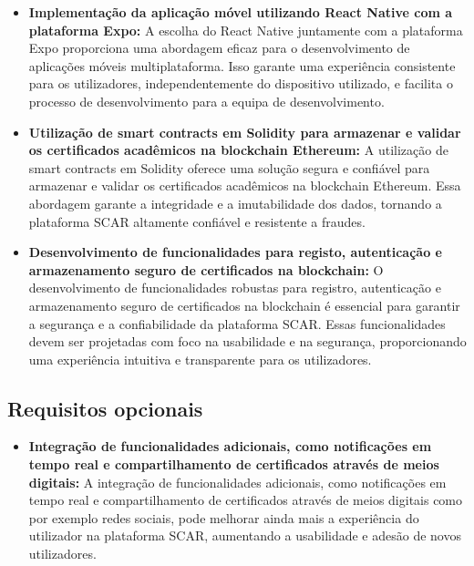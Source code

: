 \documentclass[10pt]{article}
\begin{document}
\begin{itemize}

    \item\textbf{Implementação da aplicação móvel utilizando React Native com a plataforma Expo:} A escolha do React Native
          juntamente com a plataforma Expo proporciona uma abordagem eficaz para o desenvolvimento de aplicações móveis
          multiplataforma. Isso garante uma experiência consistente para os utilizadores, independentemente do dispositivo
          utilizado, e facilita o processo de desenvolvimento para a equipa de desenvolvimento.

    \item\textbf{Utilização de smart contracts em Solidity para armazenar e validar os certificados acadêmicos na blockchain
              Ethereum:} A utilização de smart contracts em Solidity oferece uma solução segura e confiável para armazenar
          e validar os certificados acadêmicos na blockchain Ethereum. Essa abordagem garante a integridade e a
          imutabilidade dos dados, tornando a plataforma SCAR altamente confiável e resistente a fraudes.

    \item\textbf{Desenvolvimento de funcionalidades para registo, autenticação e armazenamento seguro de certificados na
              blockchain:} O desenvolvimento de funcionalidades robustas para registro, autenticação e armazenamento seguro
          de certificados na blockchain é essencial para garantir a segurança e a confiabilidade da plataforma SCAR.
          Essas funcionalidades devem ser projetadas com foco na usabilidade e na segurança, proporcionando uma
          experiência intuitiva e transparente para os utilizadores.

\end{itemize}

\subsection*{Requisitos opcionais}

\begin{itemize}

    \item\textbf{Integração de funcionalidades adicionais, como notificações em tempo real e compartilhamento de certificados
através de meios digitais:} A integração de funcionalidades adicionais, como notificações em tempo real e
compartilhamento de certificados através de meios digitais como por exemplo redes sociais, pode melhorar ainda mais a experiência do
utilizador na plataforma SCAR, aumentando a usabilidade e adesão de novos utilizadores.

\end{itemize}
\end{document}
